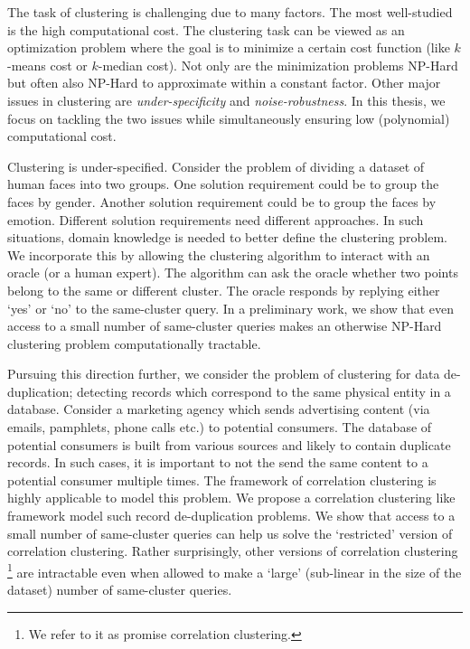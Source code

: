 \documentclass[letterpaper,12pt,titlepage,oneside,final]{book}
\begin{document}
The task of clustering is challenging due to many factors. The most well-studied is the high computational cost. The clustering task can be viewed as an optimization problem where the goal is to minimize a certain cost function (like $k$-means cost or $k$-median cost). Not only are the minimization problems NP-Hard but often also NP-Hard to approximate within a constant factor. Other major issues in clustering are \emph{under-specificity} and \emph{noise-robustness}. In this thesis, we focus on tackling the two issues while simultaneously ensuring low (polynomial) computational cost. 

Clustering is under-specified. Consider the problem of dividing a dataset of human faces into two groups. One solution requirement could be to group the faces by gender. Another solution requirement could be to group the faces by emotion. Different solution requirements need different approaches. In such situations, domain knowledge is needed to better define the clustering problem. We incorporate this by allowing the clustering algorithm to interact with an oracle (or a human expert). The algorithm can ask the oracle whether two points belong to the same or different cluster. The oracle responds by replying either `yes' or `no' to the same-cluster query. In a preliminary work, we show that even access to a small number of same-cluster queries makes an otherwise NP-Hard clustering problem computationally tractable. 

Pursuing this direction further, we consider the problem of clustering for data de-duplication; detecting records which correspond to the same physical entity in a database. Consider a marketing agency which sends advertising content (via emails, pamphlets, phone calls etc.) to potential consumers. The database of potential consumers is built from various sources and likely to contain duplicate records. In such cases, it is important to not the send the same content to a potential consumer multiple times. The framework of correlation clustering is highly applicable to model this problem. We propose a correlation clustering  like framework model such record de-duplication problems. We show that access to a small number of same-cluster queries can help us solve the `restricted' version of correlation clustering. Rather surprisingly, other versions of correlation clustering \footnote{We refer to it as promise correlation clustering.} are intractable even when allowed to make a `large' (sub-linear in the size of the dataset) number of same-cluster queries. 
\end{document}
